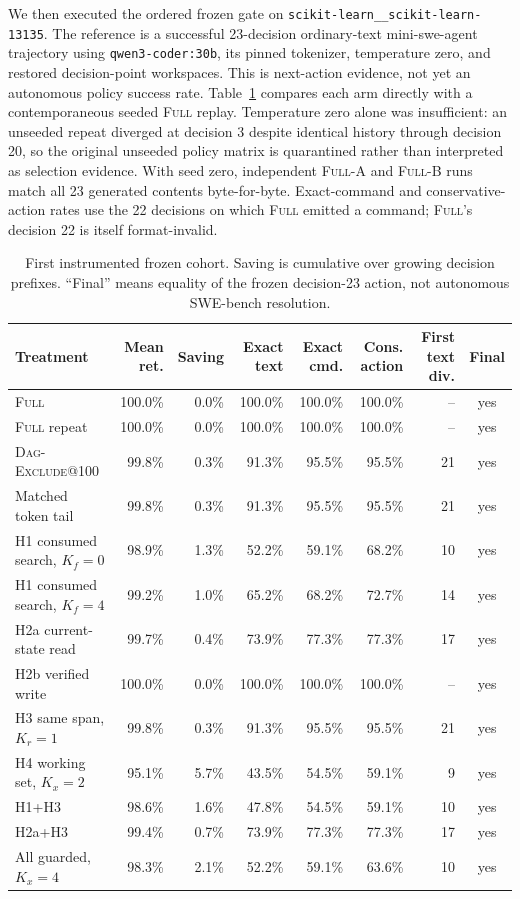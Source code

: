 \documentclass[11pt]{article}
\begin{document}
We then executed the ordered frozen gate on
\texttt{scikit-learn\_\_scikit-learn-13135}.  The reference is a successful
23-decision ordinary-text mini-swe-agent trajectory using
\texttt{qwen3-coder:30b}, its pinned tokenizer, temperature zero, and restored
decision-point workspaces.  This is next-action evidence, not yet an
autonomous policy success rate.  Table~\ref{tab:first-frozen-cohort} compares
each arm directly with a contemporaneous seeded \textsc{Full} replay.
Temperature zero alone was insufficient: an unseeded repeat diverged at
decision 3 despite identical history through decision 20, so the original
unseeded policy matrix is quarantined rather than interpreted as selection
evidence. With seed zero, independent \textsc{Full}-A and \textsc{Full}-B runs
match all 23 generated contents byte-for-byte. Exact-command and
conservative-action rates use the 22 decisions on which \textsc{Full} emitted
a command; \textsc{Full}'s decision 22 is itself format-invalid.

\begin{table}[H]
\centering
\scriptsize
\caption{First instrumented frozen cohort. Saving is cumulative over growing
decision prefixes. ``Final'' means equality of the frozen decision-23 action,
not autonomous SWE-bench resolution.}
\label{tab:first-frozen-cohort}
\begin{tabular}{lrrrrrrc}
\toprule
Treatment & Mean ret. & Saving & Exact text & Exact cmd. & Cons. action & First text div. & Final \\
\midrule
\textsc{Full} & 100.0\% & 0.0\% & 100.0\% & 100.0\% & 100.0\% & -- & yes \\
\textsc{Full} repeat & 100.0\% & 0.0\% & 100.0\% & 100.0\% & 100.0\% & -- & yes \\
\textsc{Dag-Exclude}@100 & 99.8\% & 0.3\% & 91.3\% & 95.5\% & 95.5\% & 21 & yes \\
Matched token tail & 99.8\% & 0.3\% & 91.3\% & 95.5\% & 95.5\% & 21 & yes \\
H1 consumed search, $K_f=0$ & 98.9\% & 1.3\% & 52.2\% & 59.1\% & 68.2\% & 10 & yes \\
H1 consumed search, $K_f=4$ & 99.2\% & 1.0\% & 65.2\% & 68.2\% & 72.7\% & 14 & yes \\
H2a current-state read & 99.7\% & 0.4\% & 73.9\% & 77.3\% & 77.3\% & 17 & yes \\
H2b verified write & 100.0\% & 0.0\% & 100.0\% & 100.0\% & 100.0\% & -- & yes \\
H3 same span, $K_r=1$ & 99.8\% & 0.3\% & 91.3\% & 95.5\% & 95.5\% & 21 & yes \\
H4 working set, $K_x=2$ & 95.1\% & 5.7\% & 43.5\% & 54.5\% & 59.1\% & 9 & yes \\
H1+H3 & 98.6\% & 1.6\% & 47.8\% & 54.5\% & 59.1\% & 10 & yes \\
H2a+H3 & 99.4\% & 0.7\% & 73.9\% & 77.3\% & 77.3\% & 17 & yes \\
All guarded, $K_x=4$ & 98.3\% & 2.1\% & 52.2\% & 59.1\% & 63.6\% & 10 & yes \\
\bottomrule
\end{tabular}
\end{table}
\end{document}
